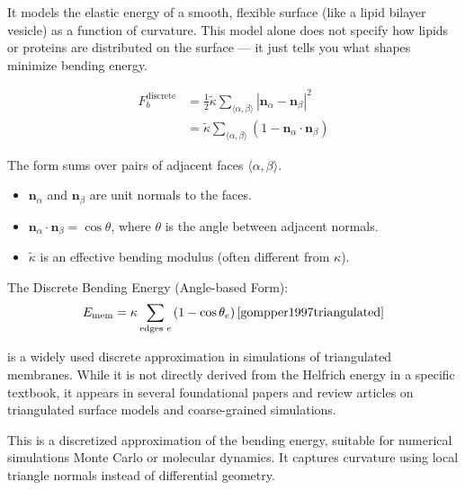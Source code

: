\documentclass[12pt]{article}
\begin{document}
\begin{flushleft}
It models the elastic energy of a smooth, flexible surface (like a lipid bilayer vesicle) as a function of curvature. This model alone does not specify how lipids or proteins are distributed on the surface — it just tells you what shapes minimize bending energy.






\begin{equation}
\begin{split}
F_b^{\text{discrete}} &= \frac{1}{2} \tilde{\kappa} \sum_{\langle \alpha, \beta \rangle} \left| \mathbf{n}_\alpha - \mathbf{n}_\beta \right|^2 \\
&= \tilde{\kappa} \sum_{\langle \alpha, \beta \rangle} \left( 1 - \mathbf{n}_\alpha \cdot \mathbf{n}_\beta \right) 
\end{split}
\end{equation}







The form sums over pairs of adjacent faces \(\langle \alpha, \beta \rangle\).

\begin{itemize}
    \item \(\mathbf{n}_\alpha\) and \(\mathbf{n}_\beta\) are unit normals to the faces.
    \item \(\mathbf{n}_\alpha \cdot \mathbf{n}_\beta = \cos \theta\), where \(\theta\) is the angle between adjacent normals.
    \item \(\tilde{\kappa}\) is an effective bending modulus (often different from \(\kappa\)).
\end{itemize}


The Discrete Bending Energy (Angle-based Form):
\begin{equation}
E_{\text{mem}} = \kappa \sum_{\text{edges } e} \left(1 - \cos \theta_e \right)\cite{gompper1997triangulated}
\end{equation}

\noindent is a widely used discrete approximation in simulations of triangulated membranes. While it is not directly derived from the Helfrich energy in a specific textbook, it appears in several foundational papers and review articles on triangulated surface models and coarse-grained simulations.




This is a discretized approximation of the bending energy, suitable for numerical simulations Monte Carlo or molecular dynamics. It captures curvature using local triangle normals instead of differential geometry.


\end{flushleft}
\end{document}

